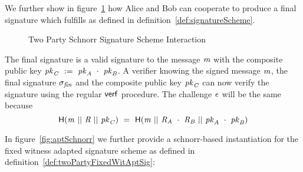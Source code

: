 We further show in figure~\ref{fig:twoparty-schnorr-prot} how Alice and Bob can cooperate to produce a final signature which fulfills \cnstCorrectness as defined in definition~\ref{def:signatureScheme}.

\begin{figure}
    \centering
    \caption{Two Party Schnorr Signature Scheme Interaction}
    \label{fig:twoparty-schnorr-prot}
\end{figure}

The final signature is a valid signature to the message $\mathit{m}$ with the composite public key $\mathit{pk}_{\mathit{C}} ~:=~ \mathit{pk}_{\mathit{A}} ~\cdot~ \mathit{pk}_{\mathit{B}}$.
A verifier knowing the signed message $\mathit{m}$, the final signature $\sigma_{\mathit{fin}}$ and the composite public key $\mathit{pk}_{\mathit{C}}$ can now verify the signature using the regular $\mathsf{verf}$ procedure.
The challenge $\mathit{e}$ will be the same because
\[ \mathsf{H} (\mathit{m} ~||~ \mathit{R} ~||~ \mathit{pk}_{\mathit{C}}) ~=~ \mathsf{H} (\mathit{m} ~||~ \mathit{R}_{\mathit{A}} ~\cdot~ \mathit{R}_{\mathit{B}} ~||~ \mathit{pk}_{\mathit{A}} ~\cdot~ \mathit{pk}_{\mathit{B}}) \]

In figure~\ref{fig:aptSchnorr} we further provide a schnorr-based instantiation for the fixed witness adapted signature scheme as defined in definition~\ref{def:twoPartyFixedWitAptSig}:

